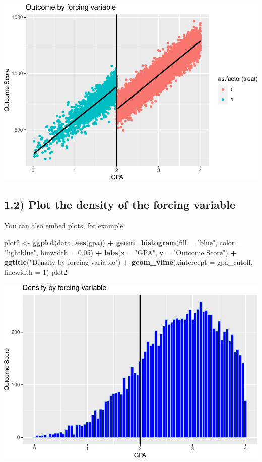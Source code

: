 \documentclass[
]{article}
\newenvironment{Shaded}{\begin{snugshade}}{\end{snugshade}}
\newcommand{\AttributeTok}[1]{\textcolor[rgb]{0.13,0.29,0.53}{#1}}
\newcommand{\DecValTok}[1]{\textcolor[rgb]{0.00,0.00,0.81}{#1}}
\newcommand{\FloatTok}[1]{\textcolor[rgb]{0.00,0.00,0.81}{#1}}
\newcommand{\FunctionTok}[1]{\textcolor[rgb]{0.13,0.29,0.53}{\textbf{#1}}}
\newcommand{\NormalTok}[1]{#1}
\newcommand{\OtherTok}[1]{\textcolor[rgb]{0.56,0.35,0.01}{#1}}
\newcommand{\SpecialCharTok}[1]{\textcolor[rgb]{0.81,0.36,0.00}{\textbf{#1}}}
\newcommand{\StringTok}[1]{\textcolor[rgb]{0.31,0.60,0.02}{#1}}
\begin{document}
\includegraphics{EM2-PS4-Estrada_files/figure-latex/part1-1.pdf}

\hypertarget{plot-the-density-of-the-forcing-variable}{%
\subsection{1.2) Plot the density of the forcing
variable}\label{plot-the-density-of-the-forcing-variable}}

You can also embed plots, for example:

\begin{Shaded}
\begin{Highlighting}[]
\NormalTok{plot2 }\OtherTok{\textless{}{-}} \FunctionTok{ggplot}\NormalTok{(data, }\FunctionTok{aes}\NormalTok{(gpa)) }\SpecialCharTok{+} 
  \FunctionTok{geom\_histogram}\NormalTok{(}\AttributeTok{fill =} \StringTok{"blue"}\NormalTok{, }\AttributeTok{color =} \StringTok{"lightblue"}\NormalTok{, }\AttributeTok{binwidth =} \FloatTok{0.05}\NormalTok{) }\SpecialCharTok{+}
  \FunctionTok{labs}\NormalTok{(}\AttributeTok{x =} \StringTok{"GPA"}\NormalTok{, }\AttributeTok{y =} \StringTok{"Outcome Score"}\NormalTok{) }\SpecialCharTok{+} \FunctionTok{ggtitle}\NormalTok{(}\StringTok{"Density by forcing variable"}\NormalTok{) }\SpecialCharTok{+}
  \FunctionTok{geom\_vline}\NormalTok{(}\AttributeTok{xintercept =}\NormalTok{ gpa\_cutoff, }\AttributeTok{linewidth =} \DecValTok{1}\NormalTok{)}
\NormalTok{plot2}
\end{Highlighting}
\end{Shaded}

\begin{center}\includegraphics[width=0.75\linewidth]{EM2-PS4-Estrada_files/figure-latex/part2-1} \end{center}
\end{document}
